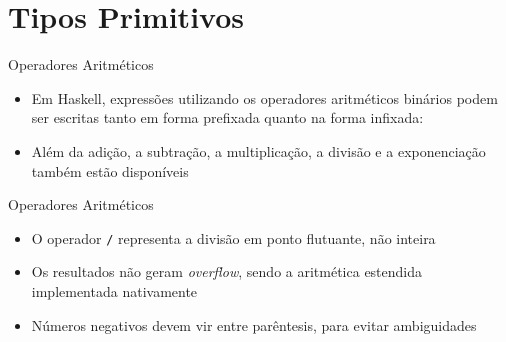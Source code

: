 \section{Tipos Primitivos}

\begin{frame}[fragile]{Operadores Aritméticos}

    \begin{itemize}
        \item Em Haskell, expressões utilizando os operadores aritméticos binários podem ser 
            escritas tanto em forma prefixada quanto na forma infixada:


        \item Além da adição, a subtração, a multiplicação, a divisão e a exponenciação
            também estão disponíveis


    \end{itemize}

\end{frame}

\begin{frame}[fragile]{Operadores Aritméticos}

    \begin{itemize}
        \item O operador \texttt{/} representa a divisão em ponto flutuante, não inteira

        \item Os resultados não geram \textit{overflow}, sendo a aritmética estendida
            implementada nativamente


        \item Números negativos devem vir entre parêntesis, para evitar ambiguidades

    \end{itemize}

\end{frame}

